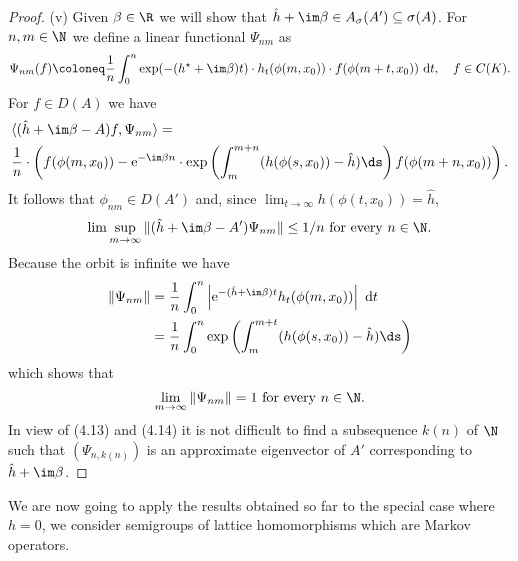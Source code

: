 \begin{proof}
(v) Given $\beta \in \R$ we will show that $\hat{h} + \im\beta \in A_{\sigma}(A') \subseteq \sigma(A)$.
For $n,m \in \N$ we define a linear functional $\Psi_{nm}$ as 
\[
		\Psi_{nm}(f) \coloneq \frac{1}{n}\int_{0}^{n} \exp(-(h^{\star}+\im\beta )t)\cdot h_{t}(\phi(m,x_{0}))\cdot f(\phi(m+t,x_{0})) \text{ d}t, \quad f\in C(K).
\]
For $f \in D(A)$ we have 
\begin{equation*}
	\begin{aligned}
	&\langle(\hat{h}+\im\beta -A)f,\Psi_{nm}\rangle = \\
	&\frac{1}{n}\cdot\left(f(\phi(m,x_{0})) - \mathrm{e}^{-\im\beta  n}\cdot %
	\exp\left(\int_{m}^{m+n} (h(\phi(s,x_{0}))-\hat{h})\ds \right)f(\phi(m+n,x_{0}))\right).
	\end{aligned}
\end{equation*}
It follows that $\phi_{nm} \in D(A')$ and, since $\lim_{t\to\infty} h(\phi(t,x_{0})) = \hat{h}$,
\begin{equation}\label{eq:b3-4.13}
	\lim \sup_{m\to\infty} \|(\hat{h}+\im\beta -A')\Psi_{nm}\| \leq 1/n \text{ for every } n \in \N.
\end{equation}
Because the orbit is infinite we have
\begin{equation*}
	\begin{aligned}
	\|\Psi_{nm}\| &= \frac{1}{n}\int_{0}^{n} \left|\mathrm{e}^{-(\hat{h}+\im\beta )t} h_{t}(\phi(m,x_{0}))\right| \text{ d}t \\
	&= \frac{1}{n}\int_{0}^{n} \exp\left(\int_{m}^{m+t} (h(\phi(s,x_{0}))-\hat{h})\ds \right)
	\end{aligned}
\end{equation*}
which shows that
\begin{equation}\label{eq:b3-4.14}
	\lim_{m\to\infty} \|\Psi_{nm}\| = 1 \text{ for every } n \in \N.
\end{equation}
In view of (4.13) and (4.14) it is not difficult to find a subsequence $k(n)$ of $\N$ such that $(\Psi_{n,k(n)})$ is an approximate eigenvector of $A'$ corresponding to $\hat{h} + \im\beta$.
\end{proof}
We are now going to apply the results obtained so far to the special case where $h = 0$, \ie we consider semigroups of lattice homomorphisms which are Markov operators.
